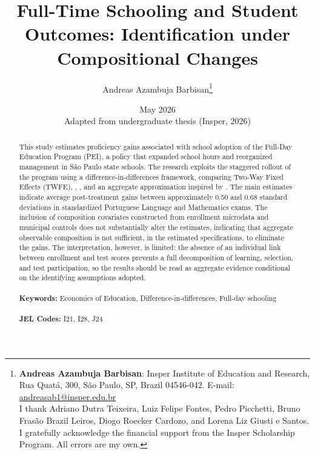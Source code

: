 \documentclass[12pt]{article}
\begin{document}
\begin{titlepage}
\title{Full-Time Schooling and Student Outcomes: Identification under Compositional Changes}
\author{Andreas Azambuja Barbisan\thanks{\textbf{Andreas Azambuja Barbisan}: Insper Institute of Education and Research, Rua Quatá, 300, São Paulo, SP, Brazil 04546-042. E-mail: \href{mailto:andreasab1@insper.edu.br}{andreasab1@insper.edu.br}\\
I thank Adriano Dutra Teixeira, Luiz Felipe Fontes, Pedro Picchetti, Bruno Frasão Brazil Leiros, Diogo Roecker Cardozo, and Lorena Liz Giusti e Santos. I gratefully acknowledge the financial support from the Insper Scholarship Program. All errors are my own.}}
\date{May 2026 \\ \small Adapted from undergraduate thesis (Insper, 2026)}
\maketitle
\begin{abstract}
\noindent This study estimates proficiency gains associated with school adoption of the Full-Day Education Program (PEI), a policy that expanded school hours and reorganized management in São Paulo state schools. The research exploits the staggered rollout of the program using a difference-in-differences framework, comparing Two-Way Fixed Effects (TWFE), \textcite{callawaysantanna}, \textcite{santannazhao}, and an aggregate approximation inspired by \textcite{santannaxu}. The main estimates indicate average post-treatment gains between approximately 0.50 and 0.68 standard deviations in standardized Portuguese Language and Mathematics exams. The inclusion of composition covariates constructed from enrollment microdata and municipal controls does not substantially alter the estimates, indicating that aggregate observable composition is not sufficient, in the estimated specifications, to eliminate the gains. The interpretation, however, is limited: the absence of an individual link between enrollment and test scores prevents a full decomposition of learning, selection, and test participation, so the results should be read as aggregate evidence conditional on the identifying assumptions adopted.\\
\vspace{0in}\\
\noindent\textbf{Keywords:} Economics of Education, Difference-in-differences, Full-day schooling\\
\vspace{0in}\\
\noindent\textbf{JEL Codes:} I21, I28, J24\\


\bigskip
\end{abstract}
\setcounter{page}{0}
\thispagestyle{empty}
\end{titlepage}
\pagebreak \newpage
\end{document}
